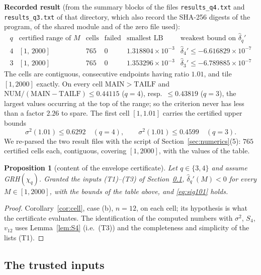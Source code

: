 \documentclass[11pt]{amsart}
\newtheorem{proposition}[theorem]{Proposition}
\theoremstyle{definition}
\numberwithin{equation}{section}
\newcommand{\hd}{\widehat\delta}
\begin{document}
\noindent\textbf{Recorded result} (from the summary blocks of the
files \texttt{results\_q4.txt} and \texttt{results\_q3.txt} of that
directory, which also record the SHA-256 digests of the program, of
the shared module and of the zero file used):
\[
\begin{array}{c|c|c|c|c|c}
q & \text{certified range of }M & \text{cells} & \text{failed} &
\text{smallest }\mathrm{LB} & \text{weakest bound on }\hd_q'\\\hline
4 & [1,\,2000] & 765 & 0 & 1.318804\times10^{-3} & \hd_4'\le-6.616829\times10^{-7}\\
3 & [1,\,2000] & 765 & 0 & 1.353296\times10^{-3} & \hd_3'\le-6.789885\times10^{-7}
\end{array}
\]
The cells are contiguous, consecutive endpoints having ratio $1.01$,
and tile $[1,2000]$ exactly. On every cell
$\mathrm{MAIN}>\mathrm{TAILF}$ and
$\mathrm{NUM}/(\mathrm{MAIN}-\mathrm{TAILF})\le0.44115$ ($q=4$), resp.\
$\le0.43819$ ($q=3$), the largest values occurring at the top of the
range; so the criterion never has less than a factor $2.26$ to spare.
The first cell $[1,1.01]$ carries the certified upper bounds
\begin{equation}\label{eq:sig101}
\sigma^2(1.01)\le0.6292\quad(q=4),\qquad
\sigma^2(1.01)\le0.4599\quad(q=3).
\end{equation}
We re-parsed the two result files with the script of
Section~\ref{sec:numerics}(5): $765$ certified cells each, contiguous,
covering $[1,2000]$, with the values of the table.

\begin{proposition}[content of the envelope certificate]
\label{prop:envcert}
Let $q\in\{3,4\}$ and assume GRH$(\chi_q)$. Granted the inputs
\textup{(T1)--(T3)} of Section~\ref{subsec:inputs},
$\hd_q'(M)<0$ for every $M\in[1,2000]$, with the bounds of the table
above, and \eqref{eq:sig101} holds.
\end{proposition}

\begin{proof}
Corollary~\ref{cor:cell}, case (b), $n=12$, on each cell; its
hypothesis is what the certificate evaluates. The identification of
the computed numbers with $\sigma^2$, $S_4$, $v_{12}$ uses
Lemma~\ref{lem:S4} (i.e.\ (T3)) and the completeness and simplicity of
the lists (T1).
\end{proof}

\subsection{The trusted inputs}\label{subsec:inputs}
\end{document}
